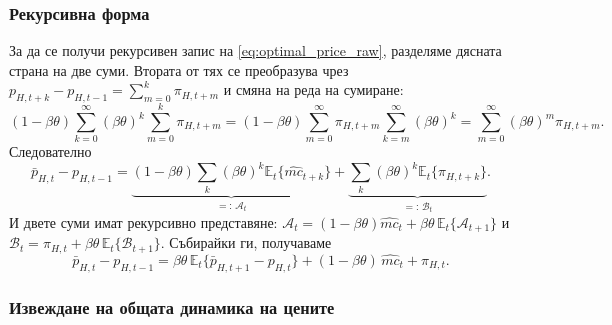 \subsubsection*{Рекурсивна форма}

За да се получи рекурсивен запис на \eqref{eq:optimal_price_raw}, разделяме дясната страна на две суми. Втората от тях се преобразува чрез $p_{H,t+k} - p_{H,t-1} = \sum_{m=0}^{k} \pi_{H,t+m}$ и смяна на реда на сумиране:
\[
(1-\beta\theta)\sum_{k=0}^{\infty}(\beta\theta)^k \sum_{m=0}^{k} \pi_{H,t+m}
= (1-\beta\theta)\sum_{m=0}^{\infty} \pi_{H,t+m} \sum_{k=m}^{\infty}(\beta\theta)^k
= \sum_{m=0}^{\infty}(\beta\theta)^m \pi_{H,t+m}.
\]
Следователно
\begin{equation}
\bar{p}_{H,t} - p_{H,t-1}
= \underbrace{(1-\beta\theta)\sum_{k}(\beta\theta)^k \mathbb{E}_t\{\widehat{mc}_{t+k}\}}_{=: \, \mathcal{A}_t}
+ \underbrace{\sum_{k}(\beta\theta)^k \mathbb{E}_t\{\pi_{H,t+k}\}}_{=: \, \mathcal{B}_t}.
\label{eq:price_two_sums}
\end{equation}
И двете суми имат рекурсивно представяне: $\mathcal{A}_t = (1-\beta\theta)\widehat{mc}_t + \beta\theta\,\mathbb{E}_t\{\mathcal{A}_{t+1}\}$ и $\mathcal{B}_t = \pi_{H,t} + \beta\theta\,\mathbb{E}_t\{\mathcal{B}_{t+1}\}$. Събирайки ги, получаваме
\begin{equation}
\bar{p}_{H,t} - p_{H,t-1} = \beta\theta\, \mathbb{E}_t\{ \bar{p}_{H,t+1} - p_{H,t} \}
+ (1-\beta\theta)\, \widehat{mc}_t + \pi_{H,t}.
\label{eq:price_recursive}
\end{equation}

\subsubsection*{Извеждане на общата динамика на цените}

